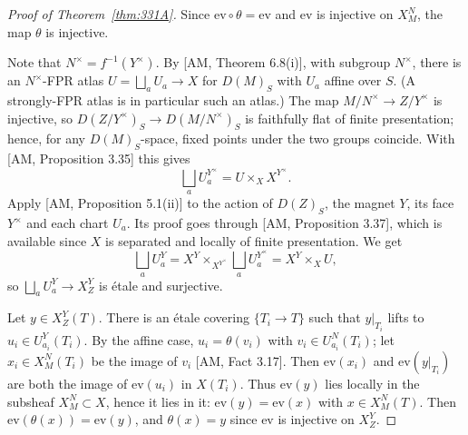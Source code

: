 \begin{proof}[Proof of Theorem~\ref{thm:331A}]
Since $\mathrm{ev}\circ\theta=\mathrm{ev}$ and $\mathrm{ev}$ is injective on $X^{N}_{M}$, the map $\theta$ is injective.

Note that $N^{\times}=f^{-1}(Y^{\times})$. By [AM, Theorem 6.8(i)], with subgroup $N^{\times}$, there is an $N^{\times}$-FPR atlas $U=\bigsqcup_a U_a\to X$ for $D(M)_S$ with $U_a$ affine over $S$. (A strongly-FPR atlas is in particular such an atlas.) The map $M/N^{\times}\to Z/Y^{\times}$ is injective, so $D(Z/Y^{\times})_S\to D(M/N^{\times})_S$ is faithfully flat of finite presentation; hence, for any $D(M)_S$-space, fixed points under the two groups coincide. With [AM, Proposition 3.35] this gives
\[
\bigsqcup_a U_a^{Y^{\times}}=U\times_X X^{Y^{\times}}.
\]
Apply [AM, Proposition 5.1(ii)] to the action of $D(Z)_S$, the magnet $Y$, its face $Y^{\times}$ and each chart $U_a$. Its proof goes through [AM, Proposition 3.37], which is available since $X$ is separated and locally of finite presentation. We get
\[
\bigsqcup_a U_a^{Y}=X^{Y}\times_{X^{Y^{\times}}}\bigsqcup_a U_a^{Y^{\times}}=X^{Y}\times_X U,
\]
so $\bigsqcup_a U_a^{Y}\to X^{Y}_{Z}$ is étale and surjective.

Let $y\in X^{Y}_{Z}(T)$. There is an étale covering $\{T_i\to T\}$ such that $y|_{T_i}$ lifts to $u_i\in U_{a_i}^{Y}(T_i)$. By the affine case, $u_i=\theta(v_i)$ with $v_i\in U_{a_i}^{N}(T_i)$; let $x_i\in X^{N}_{M}(T_i)$ be the image of $v_i$ [AM, Fact 3.17]. Then $\mathrm{ev}(x_i)$ and $\mathrm{ev}(y|_{T_i})$ are both the image of $\mathrm{ev}(u_i)$ in $X(T_i)$. Thus $\mathrm{ev}(y)$ lies locally in the subsheaf $X^{N}_{M}\subset X$, hence it lies in it: $\mathrm{ev}(y)=\mathrm{ev}(x)$ with $x\in X^{N}_{M}(T)$. Then $\mathrm{ev}(\theta(x))=\mathrm{ev}(y)$, and $\theta(x)=y$ since $\mathrm{ev}$ is injective on $X^{Y}_{Z}$.
\end{proof}

